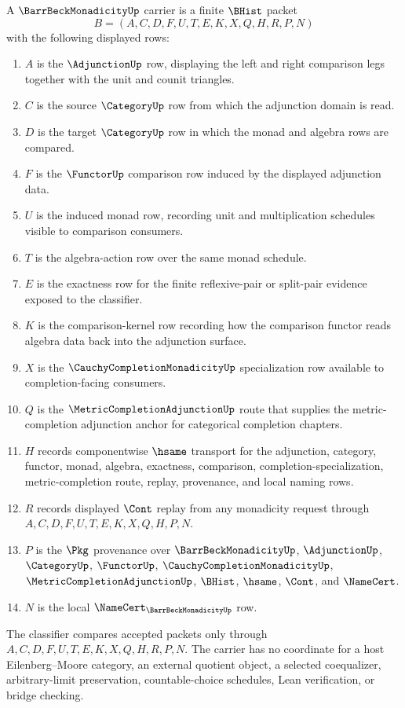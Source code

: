 \begin{definition}
\label{def:barr-beck-monadicity-carrier}
A $\BarrBeckMonadicityUp$ carrier is a finite $\BHist$ packet
$$
B=(A,C,D,F,U,T,E,K,X,Q,H,R,P,N)
$$
with the following displayed rows:
\begin{enumerate}
\item $A$ is the $\AdjunctionUp$ row, displaying the left and right comparison legs together with the unit and counit triangles.
\item $C$ is the source $\CategoryUp$ row from which the adjunction domain is read.
\item $D$ is the target $\CategoryUp$ row in which the monad and algebra rows are compared.
\item $F$ is the $\FunctorUp$ comparison row induced by the displayed adjunction data.
\item $U$ is the induced monad row, recording unit and multiplication schedules visible to comparison consumers.
\item $T$ is the algebra-action row over the same monad schedule.
\item $E$ is the exactness row for the finite reflexive-pair or split-pair evidence exposed to the classifier.
\item $K$ is the comparison-kernel row recording how the comparison functor reads algebra data back into the adjunction surface.
\item $X$ is the $\CauchyCompletionMonadicityUp$ specialization row available to completion-facing consumers.
\item $Q$ is the $\MetricCompletionAdjunctionUp$ route that supplies the metric-completion adjunction anchor for categorical completion chapters.
\item $H$ records componentwise $\hsame$ transport for the adjunction, category, functor, monad, algebra, exactness, comparison, completion-specialization, metric-completion route, replay, provenance, and local naming rows.
\item $R$ records displayed $\Cont$ replay from any monadicity request through $A,C,D,F,U,T,E,K,X,Q,H,P,N$.
\item $P$ is the $\Pkg$ provenance over $\BarrBeckMonadicityUp$, $\AdjunctionUp$, $\CategoryUp$, $\FunctorUp$, $\CauchyCompletionMonadicityUp$, $\MetricCompletionAdjunctionUp$, $\BHist$, $\hsame$, $\Cont$, and $\NameCert$.
\item $N$ is the local $\NameCert_{\BarrBeckMonadicityUp}$ row.
\end{enumerate}
The classifier compares accepted packets only through $A,C,D,F,U,T,E,K,X,Q,H,R,P,N$. The carrier has no coordinate for a host Eilenberg--Moore category, an external quotient object, a selected coequalizer, arbitrary-limit preservation, countable-choice schedules, Lean verification, or bridge checking.
\end{definition}

